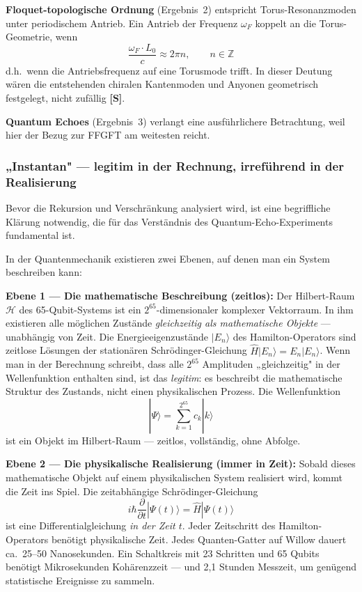 \textbf{Floquet-topologische Ordnung} (Ergebnis~2) entspricht Torus-Resonanzmoden
unter periodischem Antrieb. Ein Antrieb der Frequenz $\omega_F$ koppelt an die
Torus-Geometrie, wenn
\begin{equation}
    \frac{\omega_F \cdot L_0}{c} \approx 2\pi n, \qquad n \in \mathbb{Z}
\end{equation}
d.h.\ wenn die Antriebsfrequenz auf eine Torusmode trifft. In dieser Deutung wären die entstehenden chiralen
Kantenmoden und Anyonen geometrisch festgelegt, nicht zufällig \textbf{[S]}.

\textbf{Quantum Echoes} (Ergebnis~3) verlangt eine ausführlichere Betrachtung,
weil hier der Bezug zur FFGFT am weitesten reicht.

\subsubsection*{„Instantan" — legitim in der Rechnung, irreführend in der Realisierung}

Bevor die Rekursion und Verschränkung analysiert wird, ist eine begriffliche
Klärung notwendig, die für das Verständnis des Quantum-Echo-Experiments fundamental ist.

In der Quantenmechanik existieren zwei Ebenen, auf denen man ein System beschreiben kann:

\textbf{Ebene 1 — Die mathematische Beschreibung (zeitlos):}
Der Hilbert-Raum $\mathcal{H}$ des 65-Qubit-Systems ist ein
$2^{65}$-dimensionaler komplexer Vektorraum. In ihm existieren alle möglichen
Zustände \emph{gleichzeitig als mathematische Objekte} — unabhängig von Zeit.
Die Energieeigenzustände $|E_n\rangle$ des Hamilton-Operators sind zeitlose
Lösungen der stationären Schrödinger-Gleichung $\hat{H}|E_n\rangle = E_n|E_n\rangle$.
Wenn man in der Berechnung schreibt, dass alle $2^{65}$ Amplituden
„gleichzeitig" in der Wellenfunktion enthalten sind, ist das \emph{legitim}:
es beschreibt die mathematische Struktur des Zustands, nicht einen physikalischen
Prozess. Die Wellenfunktion
\begin{equation}
    |\Psi\rangle = \sum_{k=1}^{2^{65}} c_k |k\rangle
\end{equation}
ist ein Objekt im Hilbert-Raum — zeitlos, vollständig, ohne Abfolge.

\textbf{Ebene 2 — Die physikalische Realisierung (immer in Zeit):}
Sobald dieses mathematische Objekt auf einem physikalischen System realisiert wird,
kommt die Zeit ins Spiel. Die zeitabhängige Schrödinger-Gleichung
\begin{equation}
    i\hbar \frac{\partial}{\partial t}|\Psi(t)\rangle = \hat{H}|\Psi(t)\rangle
\end{equation}
ist eine Differentialgleichung \emph{in der Zeit $t$}. Jeder Zeitschritt des
Hamilton-Operators benötigt physikalische Zeit. Jedes Quanten-Gatter auf Willow
dauert ca.\ 25--50 Nanosekunden. Ein Schaltkreis mit 23 Schritten und 65 Qubits
benötigt Mikrosekunden Kohärenzzeit — und 2,1 Stunden Messzeit, um genügend
statistische Ereignisse zu sammeln.

